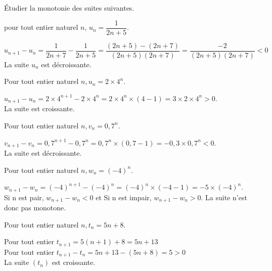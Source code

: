 \documentclass[12pt,a4paper]{article}  %
\begin{document}
Étudier la monotonie des suites suivantes.
\begin{enumMet}
    \item pour tout entier naturel $n$, $u_{n}=\dfrac{1}{2 n+5}$.\\
    \begin{corrBox}
        $u_{n+1}-u_n=\dfrac{1}{2n+7}-\dfrac{1}{2n+5}=\dfrac{(2n+5)-(2n+7)}{(2n+5)(2n+7)}=\dfrac{-2}{(2n+5)(2n+7)}<0$\\
        La suite $u_n$ est décroissante. 
    \end{corrBox}
    \item Pour tout entier naturel $n, u_{n}=2\times4^{n}$.\\
    \begin{corrBox}
        $u_{n+1}-u_n=2\times4^{n+1}-2\times4^n=2\times4^n\times(4-1)=3\times2\times4^n>0$.\\
        La suite est croissante.
    \end{corrBox}
    \item Pour tout entier naturel $n, v_{n}=0,7^{n}$.\\
    \begin{corrBox}
        $v_{n+1}-v_n=0,7^{n+1}-0,7^n=0,7^n\times(0,7-1)=-0,3\times0,7^n<0$.\\
        La suite est décroissante.
    \end{corrBox}
    \item Pour tout entier naturel $n, w_{n}=(-4)^{n}$.\\
    \begin{corrBox}
        $w_{n+1}-w_n=(-4)^{n+1}-(-4)^n=(-4)^n\times(-4-1)=-5\times(-4)^n$.\\
        Si n est pair, $w_{n+1}-w_n<0$ et Si n est impair, $w_{n+1}-w_n>0$. La suite n'est donc pas monotone.
    \end{corrBox}
    \item {} Pour tout entier naturel $n, t_{n}=5 n+8$.\\
    \begin{corrBox}
        Pour tout entier $t_{n+1}=5(n+1)+8=5n+13$\\
        Pour tout entier $t_{n+1}-t_{n}=5n+13-(5n+8)=5>0$\\
        La suite $\left(t_{n}\right)$ est croissante.\\
    \end{corrBox}
\end{enumMet}
\end{document}
